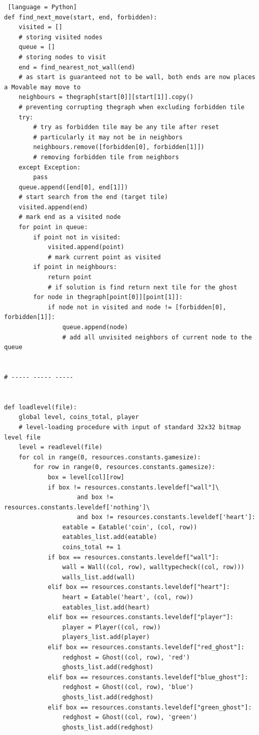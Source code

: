\documentclass[11pt,a4paper,notitlepage]{report}
\begin{document}
\begin{lstlisting} [language = Python]
def find_next_move(start, end, forbidden):
    visited = []
    # storing visited nodes
    queue = []
    # storing nodes to visit
    end = find_nearest_not_wall(end)
    # as start is guaranteed not to be wall, both ends are now places a Movable may move to
    neighbours = thegraph[start[0]][start[1]].copy()
    # preventing corrupting thegraph when excluding forbidden tile
    try:
        # try as forbidden tile may be any tile after reset
        # particularly it may not be in neighbors
        neighbours.remove([forbidden[0], forbidden[1]])
        # removing forbidden tile from neighbors
    except Exception:
        pass
    queue.append([end[0], end[1]])
    # start search from the end (target tile)
    visited.append(end)
    # mark end as a visited node
    for point in queue:
        if point not in visited:
            visited.append(point)
            # mark current point as visited
        if point in neighbours:
            return point
            # if solution is find return next tile for the ghost
        for node in thegraph[point[0]][point[1]]:
            if node not in visited and node != [forbidden[0], forbidden[1]]:
                queue.append(node)
                # add all unvisited neighbors of current node to the queue


# ----- ----- -----


def loadlevel(file):
    global level, coins_total, player
    # level-loading procedure with input of standard 32x32 bitmap level file
    level = readlevel(file)
    for col in range(0, resources.constants.gamesize):
        for row in range(0, resources.constants.gamesize):
            box = level[col][row]
            if box != resources.constants.leveldef["wall"]\
                    and box != resources.constants.leveldef['nothing']\
                    and box != resources.constants.leveldef['heart']:
                eatable = Eatable('coin', (col, row))
                eatables_list.add(eatable)
                coins_total += 1
            if box == resources.constants.leveldef["wall"]:
                wall = Wall((col, row), walltypecheck((col, row)))
                walls_list.add(wall)
            elif box == resources.constants.leveldef["heart"]:
                heart = Eatable('heart', (col, row))
                eatables_list.add(heart)
            elif box == resources.constants.leveldef["player"]:
                player = Player((col, row))
                players_list.add(player)
            elif box == resources.constants.leveldef["red_ghost"]:
                redghost = Ghost((col, row), 'red')
                ghosts_list.add(redghost)
            elif box == resources.constants.leveldef["blue_ghost"]:
                redghost = Ghost((col, row), 'blue')
                ghosts_list.add(redghost)
            elif box == resources.constants.leveldef["green_ghost"]:
                redghost = Ghost((col, row), 'green')
                ghosts_list.add(redghost)



\end{lstlisting}
\end{document}
